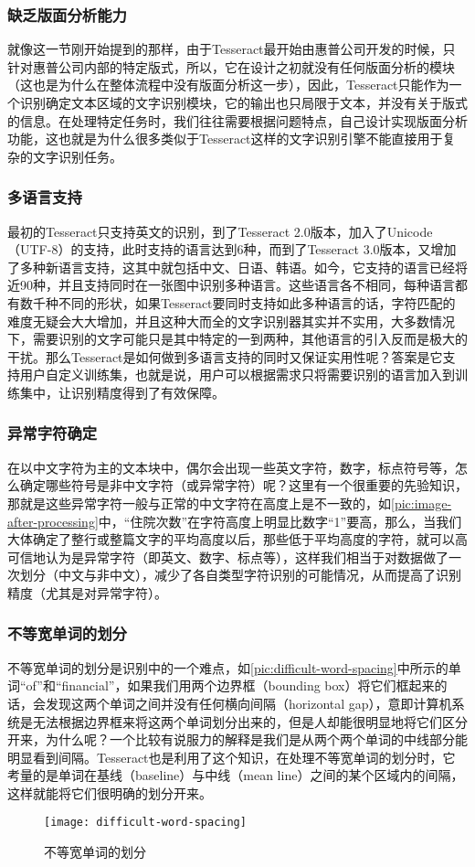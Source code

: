 \subsubsection*{缺乏版面分析能力}
就像这一节刚开始提到的那样，由于Tesseract最开始由惠普公司开发的时候，只针对惠普公司内部的特定版式，所以，它在设计之初就没有任何版面分析的模块（这也是为什么在整体流程中没有版面分析这一步），因此，Tesseract只能作为一个识别确定文本区域的文字识别模块，它的输出也只局限于文本，并没有关于版式的信息。在处理特定任务时，我们往往需要根据问题特点，自己设计实现版面分析功能，这也就是为什么很多类似于Tesseract这样的文字识别引擎不能直接用于复杂的文字识别任务。

\subsubsection*{多语言支持}
最初的Tesseract只支持英文的识别，到了Tesseract 2.0版本，加入了Unicode（UTF-8）的支持，此时支持的语言达到6种，而到了Tesseract 3.0版本，又增加了多种新语言支持，这其中就包括中文、日语、韩语。如今，它支持的语言已经将近90种，并且支持同时在一张图中识别多种语言。这些语言各不相同，每种语言都有数千种不同的形状，如果Tesseract要同时支持如此多种语言的话，字符匹配的难度无疑会大大增加，并且这种大而全的文字识别器其实并不实用，大多数情况下，需要识别的文字可能只是其中特定的一到两种，其他语言的引入反而是极大的干扰。那么Tesseract是如何做到多语言支持的同时又保证实用性呢？答案是它支持用户自定义训练集，也就是说，用户可以根据需求只将需要识别的语言加入到训练集中，让识别精度得到了有效保障。

\subsubsection*{异常字符确定}
在以中文字符为主的文本块中，偶尔会出现一些英文字符，数字，标点符号等，怎么确定哪些符号是非中文字符（或异常字符）呢？这里有一个很重要的先验知识，那就是这些异常字符一般与正常的中文字符在高度上是不一致的，如\autoref{pic:image-after-processing}中，“住院次数”在字符高度上明显比数字“1”要高，那么，当我们大体确定了整行或整篇文字的平均高度以后，那些低于平均高度的字符，就可以高可信地认为是异常字符（即英文、数字、标点等），这样我们相当于对数据做了一次划分（中文与非中文），减少了各自类型字符识别的可能情况，从而提高了识别精度（尤其是对异常字符）。

\subsubsection*{不等宽单词的划分}
不等宽单词的划分是识别中的一个难点，如\autoref{pic:difficult-word-spacing}中所示的单词“of”和“financial”，如果我们用两个边界框（bounding box）将它们框起来的话，会发现这两个单词之间并没有任何横向间隔（horizontal gap），意即计算机系统是无法根据边界框来将这两个单词划分出来的，但是人却能很明显地将它们区分开来，为什么呢？一个比较有说服力的解释是我们是从两个两个单词的中线部分能明显看到间隔。Tesseract也是利用了这个知识，在处理不等宽单词的划分时，它考量的是单词在基线（baseline）与中线（mean line）之间的某个区域内的间隔，这样就能将它们很明确的划分开来。
\begin{figure}
	\centering
	\texttt{[image: difficult-word-spacing]}
	\caption{不等宽单词的划分}
	\label{pic:difficult-word-spacing}
\end{figure}

